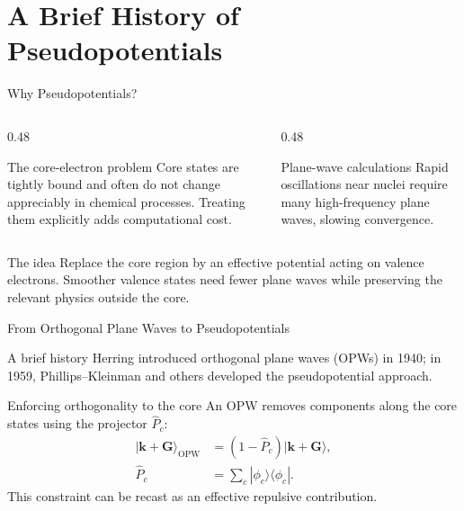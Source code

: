\documentclass[8pt]{beamer}
\begin{document}
\section{A Brief History of Pseudopotentials}

\begin{frame}{Why Pseudopotentials?}
	\begin{columns}[T]
		\begin{column}{0.48\textwidth}
			\begin{block}{The core-electron problem}
				Core states are tightly bound and often do not change appreciably
				in chemical processes. Treating them explicitly adds computational cost.
			\end{block}
		\end{column}
		\begin{column}{0.48\textwidth}
			\begin{block}{Plane-wave calculations}
				Rapid oscillations near nuclei require many high-frequency plane waves,
				slowing convergence.
			\end{block}
		\end{column}
	\end{columns}

	\begin{block}{The idea}
		Replace the core region by an effective potential acting on valence electrons.
		Smoother valence states need fewer plane waves while preserving the relevant
		physics outside the core.
	\end{block}
\end{frame}

\begin{frame}{From Orthogonal Plane Waves to Pseudopotentials}
	\begin{block}{A brief history}
		Herring introduced orthogonal plane waves (OPWs) in 1940; in 1959,
		Phillips--Kleinman and others developed the pseudopotential approach.
	\end{block}

	\begin{block}{Enforcing orthogonality to the core}
		An OPW removes components along the core states using the projector
		$\hat{P}_c$:
		\[
			\begin{aligned}
				|\mathbf{k}+\mathbf{G}\rangle_{\mathrm{OPW}}
				&=(1-\hat{P}_c)|\mathbf{k}+\mathbf{G}\rangle,\\
				\hat{P}_c&=\sum_c|\phi_c\rangle\langle\phi_c|.
			\end{aligned}
		\]
		This constraint can be recast as an effective repulsive contribution.
	\end{block}
\end{frame}
\end{document}
